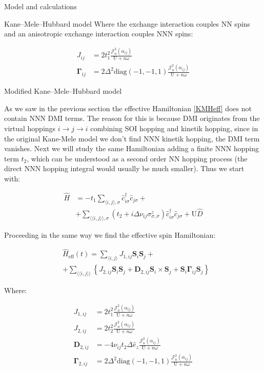 \documentclass[aps,prl,twocolumn,amsmath,amssymb,superscriptaddress,nobibnotes]{revtex4}%
\newcommand{\n}{\nonumber}
\newcommand{\bs}{\boldsymbol}
\begin{document}
\begin{section}{Model and calculations}
\begin{subsection}{Kane--Mele--Hubbard model}
Where the exchange interaction couples NN spins and an anisotropic exchange interaction couples NNN spins:

\begin{align*}
J_{ij} &= 2t_1^2\frac{\mathcal{J}_{n}^2(\alpha_{ij})}{\text{U}+n\omega} \\
\bs{\Gamma}_{ij} &= 2\Delta^2 \text{diag}(-1,-1,1)\frac{\mathcal{J}_{n}^2(\alpha_{ij})}{\text{U}+n\omega}
\end{align*}
\end{subsection}

\begin{subsection}{Modified Kane--Mele--Hubbard model}

As we saw in the previous section the effective Hamiltonian \ref{KMHeff} does not contain NNN DMI terms. The reason for this is because DMI originates from the virtual hoppings $i\rightarrow j\rightarrow i$ combining SOI hopping and kinetik hopping, since in the original Kane-Mele model we don't find NNN kinetik hopping, the DMI term vanishes. Next we will study the same Hamiltonian adding a finite NNN hopping term $t_2$, which can be understood as a second order NN hopping process (the direct NNN hopping integral would usually be much smaller). Thus we start with:

\begin{align}
\label{MKMH}
\hat{H} &= - t_1\sum_{\langle i,j \rangle, \sigma} \hat{c}_{i \sigma}^\dagger \hat{c}_{j \sigma} + \n \\
	&+\sum_{\langle \langle i,j \rangle \rangle, \sigma}(t_2 + i\Delta\nu_{ij}\sigma^z_{\sigma, \sigma})\hat{c}_{i \sigma}^\dagger \hat{c}_{j \sigma} + 
	\text{U}\hat{D}
\end{align}

Proceeding in the same way we find the effective spin Hamiltonian:

\begin{align}
\label{MKMHeff}
&\hat{H}_{\text{eff}}(t) = \sum_{\langle i,j \rangle} J_{1,ij}\bs{S}_i\bs{S}_j +\n \\
&+ \sum_{\langle \langle i,j \rangle \rangle} \left\{ J_{2,ij}\bs{S}_i\bs{S}_j + \bs{D}_{2,ij} \bs{S}_i \times \bs{S}_j + \bs{S}_i \bs{\Gamma}_{ij} \bs{S}_j \right\}
\end{align}

Where:

\begin{align*}
J_{1,ij} &= 2t_1^2\frac{\mathcal{J}_{n}^2(\alpha_{ij})}{\text{U}+n\omega} \\
J_{2,ij} &= 2t_2^2\frac{\mathcal{J}_{n}^2(\alpha_{ij})}{\text{U}+n\omega} \\
\bs{D}_{2,ij} &= - 4\nu_{ij} t_2 \Delta \hat{e}_z \frac{\mathcal{J}_{n}^2(\alpha_{ij})}{\text{U}+n\omega} \\
\bs{\Gamma}_{2,ij} &= 2\Delta^2 \text{diag}(-1,-1,1) \frac{\mathcal{J}_{n}^2(\alpha_{ij})}{\text{U}+n\omega}
\end{align*}


\end{subsection}
\end{section}
\end{document}
